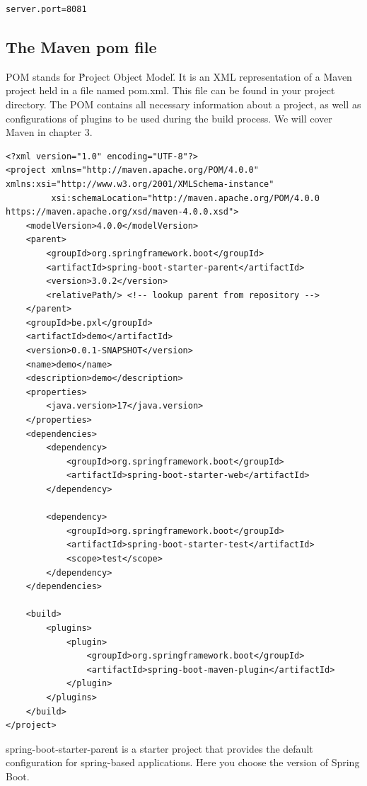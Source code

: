 \documentclass[a4paper, 12pt]{report}
\begin{document}
\begin{lstlisting}[frame=single]
server.port=8081
\end{lstlisting}

\subsection{The Maven pom file}

POM stands for \'Project Object Model\'. It is an XML representation of a Maven project held in a file named pom.xml. This file can be found in your project directory. The POM contains all necessary information about a project, as well as configurations of plugins to be used during the build process. We will cover Maven in chapter 3.

\begin{lstlisting}[frame=single]
<?xml version="1.0" encoding="UTF-8"?>
<project xmlns="http://maven.apache.org/POM/4.0.0" xmlns:xsi="http://www.w3.org/2001/XMLSchema-instance"
         xsi:schemaLocation="http://maven.apache.org/POM/4.0.0 https://maven.apache.org/xsd/maven-4.0.0.xsd">
    <modelVersion>4.0.0</modelVersion>
    <parent>
        <groupId>org.springframework.boot</groupId>
        <artifactId>spring-boot-starter-parent</artifactId>
        <version>3.0.2</version>
        <relativePath/> <!-- lookup parent from repository -->
    </parent>
    <groupId>be.pxl</groupId>
    <artifactId>demo</artifactId>
    <version>0.0.1-SNAPSHOT</version>
    <name>demo</name>
    <description>demo</description>
    <properties>
        <java.version>17</java.version>
    </properties>
    <dependencies>
        <dependency>
            <groupId>org.springframework.boot</groupId>
            <artifactId>spring-boot-starter-web</artifactId>
        </dependency>

        <dependency>
            <groupId>org.springframework.boot</groupId>
            <artifactId>spring-boot-starter-test</artifactId>
            <scope>test</scope>
        </dependency>
    </dependencies>

    <build>
        <plugins>
            <plugin>
                <groupId>org.springframework.boot</groupId>
                <artifactId>spring-boot-maven-plugin</artifactId>
            </plugin>
        </plugins>
    </build>
</project>
\end{lstlisting}

spring-boot-starter-parent is a starter project that provides the default configuration for spring-based applications. Here you choose the version of Spring Boot.
\end{document}
